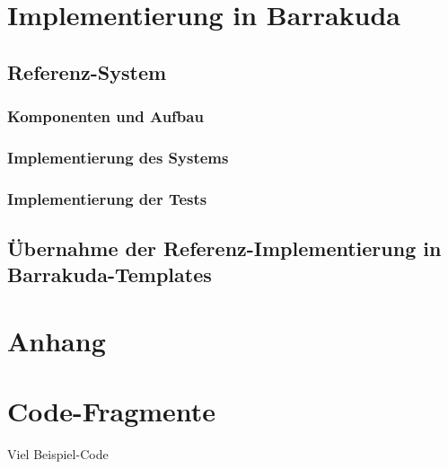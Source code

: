 \documentclass[12pt,a4paper,bibliography=totocnumbered,listof=totocnumbered]{scrartcl}
\begin{document}
\section{Implementierung in Barrakuda}

\subsection{Referenz-System}

\subsubsection{Komponenten und Aufbau}

\subsubsection{Implementierung des Systems}

\subsubsection{Implementierung der Tests}

\subsection{Übernahme der Referenz-Implementierung in Barrakuda-Templates}

\renewcommand\refname{Quellenverzeichnis}


\pagebreak

\setcounter{page}{1}

\begin{appendix}
\section*{Anhang}
{}

\section{Code-Fragmente}
Viel Beispiel-Code

\end{appendix}
\end{document}

